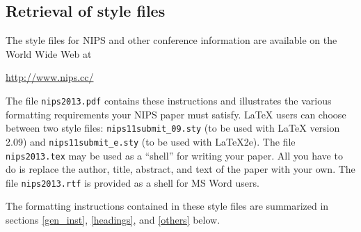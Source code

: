 \documentclass{article} %
\begin{document}



\subsection{Retrieval of style files}

The style files for NIPS and other conference information are available on the World Wide Web at
\begin{center}
   \url{http://www.nips.cc/}
\end{center}
The file \verb+nips2013.pdf+ contains these 
instructions and illustrates the
various formatting requirements your NIPS paper must satisfy. \LaTeX{}
users can choose between two style files:
\verb+nips11submit_09.sty+ (to be used with \LaTeX{} version 2.09) and
\verb+nips11submit_e.sty+ (to be used with \LaTeX{}2e). The file
\verb+nips2013.tex+ may be used as a ``shell'' for writing your paper. All you
have to do is replace the author, title, abstract, and text of the paper with
your own. The file
\verb+nips2013.rtf+ is provided as a shell for MS Word users.

The formatting instructions contained in these style files are summarized in
sections \ref{gen_inst}, \ref{headings}, and \ref{others} below.


\end{document}
